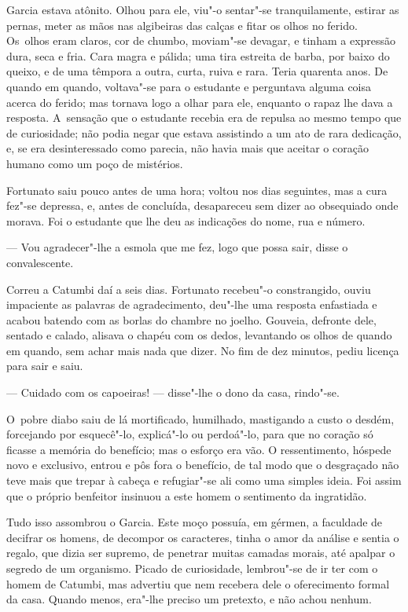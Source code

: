 \begin{linenumbers}
Garcia estava atônito. Olhou para ele, viu"-o sentar"-se tranquilamente,
estirar as pernas, meter as mãos nas algibeiras das calças e fitar os
olhos no ferido. Os~olhos eram claros, cor de chumbo, moviam"-se devagar,
e tinham a expressão dura, seca e fria. Cara magra e pálida; uma tira
estreita de barba, por baixo do queixo, e de uma têmpora a outra, curta,
ruiva e rara. Teria quarenta anos. De quando em quando, voltava"-se para
o estudante e perguntava alguma coisa acerca do ferido; mas tornava logo
a olhar para ele, enquanto o rapaz lhe dava a resposta. A~sensação que o
estudante recebia era de repulsa ao mesmo tempo que de curiosidade; não
podia negar que estava assistindo a um ato de rara dedicação, e, se era
desinteressado como parecia, não havia mais que aceitar o coração humano
como um poço de mistérios.

Fortunato saiu pouco antes de uma hora; voltou nos dias seguintes, mas a
cura fez"-se depressa, e, antes de concluída, desapareceu sem dizer ao
obsequiado onde morava. Foi o estudante que lhe deu as indicações do
nome, rua e número.

--- Vou agradecer"-lhe a esmola que me fez, logo que possa sair, disse o
convalescente.

Correu a Catumbi daí a seis dias. Fortunato recebeu"-o constrangido,
ouviu impaciente as palavras de agradecimento, deu"-lhe uma resposta
enfastiada e acabou batendo com as borlas do chambre no joelho. Gouveia,
defronte dele, sentado e calado, alisava o chapéu com os dedos,
levantando os olhos de quando em quando, sem achar mais nada que dizer.
No fim de dez minutos, pediu licença para sair e saiu.

--- Cuidado com os capoeiras! --- disse"-lhe o dono da casa, rindo"-se.

O~pobre diabo saiu de lá mortificado, humilhado, mastigando a custo o
desdém, forcejando por esquecê"-lo, explicá"-lo ou perdoá"-lo, para que no
coração só ficasse a memória do benefício; mas o esforço era vão. O
ressentimento, hóspede novo e exclusivo, entrou e pôs fora o benefício,
de tal modo que o desgraçado não teve mais que trepar à cabeça e
refugiar"-se ali como uma simples ideia. Foi assim que o próprio
benfeitor insinuou a este homem o sentimento da ingratidão.

Tudo isso assombrou o Garcia. Este moço possuía, em gérmen, a faculdade
de decifrar os homens, de decompor os caracteres, tinha o amor da
análise e sentia o regalo, que dizia ser supremo, de penetrar muitas
camadas morais, até apalpar o segredo de um organismo. Picado de
curiosidade, lembrou"-se de ir ter com o homem de Catumbi, mas advertiu
que nem recebera dele o oferecimento formal da casa. Quando menos,
era"-lhe preciso um pretexto, e não achou nenhum.


\end{linenumbers}
